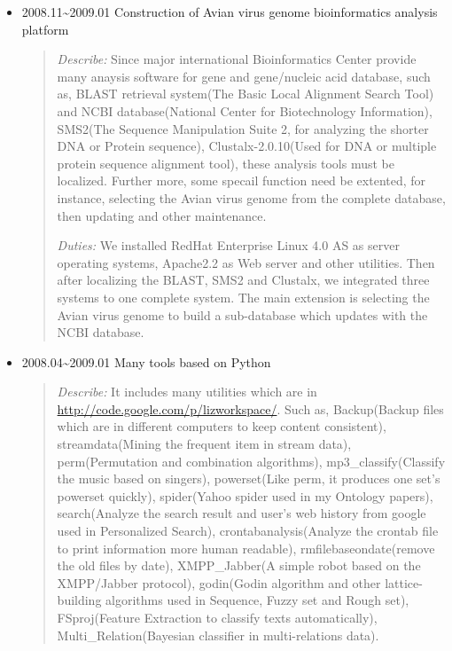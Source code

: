 \documentclass[a4paper,10pt,english]{manual}
\begin{document}
\begin{itemize}
\item {} 
2008.11\textasciitilde{}2009.01 Construction of Avian virus genome bioinformatics analysis platform
\begin{quote}

\emph{Describe:} Since major international Bioinformatics Center provide many anaysis software for gene and gene/nucleic acid database, such as, BLAST retrieval system(The Basic Local Alignment Search Tool) and NCBI database(National Center for Biotechnology Information), SMS2(The Sequence Manipulation Suite 2, for analyzing the shorter DNA or Protein sequence), Clustalx-2.0.10(Used for DNA or multiple protein sequence alignment tool), these analysis tools must be localized. Further more, some specail function need be extented, for instance, selecting the Avian virus genome from the complete database, then updating and other maintenance.

\emph{Duties:} We installed RedHat Enterprise Linux 4.0 AS as server operating systems, Apache2.2 as Web server and other utilities. Then after localizing the BLAST, SMS2 and Clustalx, we integrated three systems to one complete system. The main extension is selecting the Avian virus genome to build a sub-database which updates with the NCBI database.
\end{quote}

\item {} 
2008.04\textasciitilde{}2009.01 Many tools based on Python
\begin{quote}

\emph{Describe:} It includes many utilities which are in \href{http://code.google.com/p/lizworkspace/}{http://code.google.com/p/lizworkspace/}. Such as, Backup(Backup files which are in different computers to keep content consistent), streamdata(Mining the frequent item in stream data), perm(Permutation and combination algorithms), mp3\_classify(Classify the music based on singers), powerset(Like perm, it produces one set's powerset quickly), spider(Yahoo spider used in my Ontology papers), search(Analyze the search result and user's web history from google used in Personalized Search), crontabanalysis(Analyze the crontab file to print information more human readable), rmfilebaseondate(remove the old files by date), XMPP\_Jabber(A simple robot  based on the XMPP/Jabber protocol), godin(Godin algorithm and other lattice-building algorithms used in Sequence, Fuzzy set and Rough set), FSproj(Feature Extraction to classify texts automatically), Multi\_Relation(Bayesian classifier in multi-relations data).
\end{quote}

\end{itemize}
\end{document}
